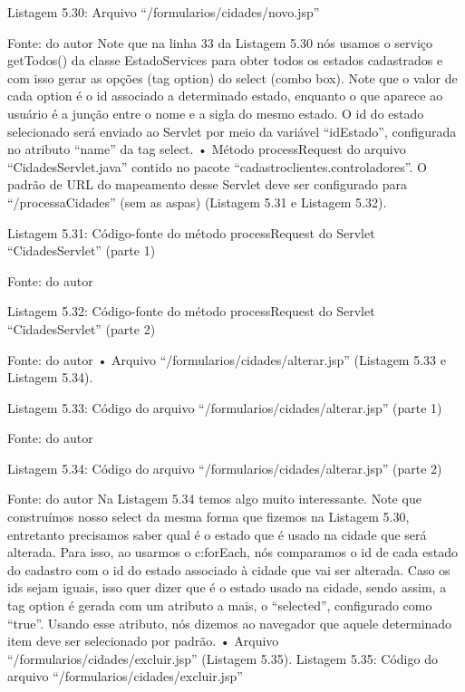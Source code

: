 Listagem 5.30: Arquivo ``/formularios/cidades/novo.jsp''
 
Fonte: do autor
Note que na linha 33 da Listagem 5.30 nós usamos o serviço getTodos() da classe EstadoServices para obter todos os estados cadastrados e com isso gerar as opções (tag option) do select (combo box). Note que o valor de cada option é o id associado a determinado estado, enquanto o que aparece ao usuário é a junção entre o nome e a sigla do mesmo estado. O id do estado selecionado será enviado ao Servlet por meio da variável ``idEstado'', configurada no atributo ``name'' da tag select.
•	Método processRequest do arquivo ``CidadesServlet.java'' contido no pacote ``cadastroclientes.controladores''. O padrão de URL do mapeamento desse Servlet deve ser configurado para ``/processaCidades'' (sem as aspas) (Listagem 5.31 e Listagem 5.32).



















Listagem 5.31: Código-fonte do método processRequest do Servlet ``CidadesServlet'' (parte 1)
 
Fonte: do autor



Listagem 5.32: Código-fonte do método processRequest do Servlet ``CidadesServlet'' (parte 2)
 
Fonte: do autor
•	Arquivo ``/formularios/cidades/alterar.jsp'' (Listagem 5.33 e Listagem 5.34).


Listagem 5.33: Código do arquivo ``/formularios/cidades/alterar.jsp'' (parte 1)
 
Fonte: do autor










Listagem 5.34: Código do arquivo ``/formularios/cidades/alterar.jsp'' (parte 2)
 
Fonte: do autor
Na Listagem 5.34 temos algo muito interessante. Note que construímos nosso select da mesma forma que fizemos na Listagem 5.30, entretanto precisamos saber qual é o estado que é usado na cidade que será alterada. Para isso, ao usarmos o c:forEach, nós comparamos o id de cada estado do cadastro com o id do estado associado à cidade que vai ser alterada. Caso os ids sejam iguais, isso quer dizer que é o estado usado na cidade, sendo assim, a tag option é gerada com um atributo a mais, o ``selected'', configurado como ``true''. Usando esse atributo, nós dizemos ao navegador que aquele determinado item deve ser selecionado por padrão.
•	Arquivo ``/formularios/cidades/excluir.jsp'' (Listagem 5.35).
Listagem 5.35: Código do arquivo ``/formularios/cidades/excluir.jsp''
 
